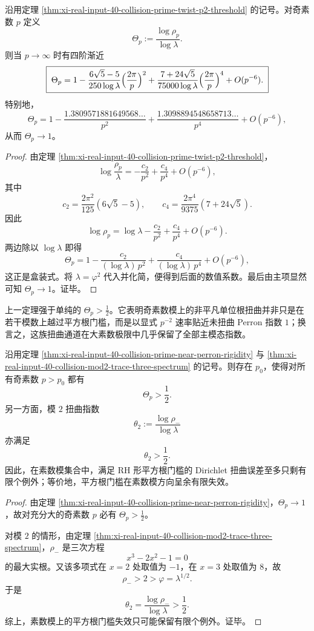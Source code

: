 \begin{theorem}[奇素数单位根扭曲的近主模态刚性]\label{thm:xi-real-input-40-collision-prime-near-perron-rigidity}
沿用定理 \ref{thm:xi-real-input-40-collision-prime-twist-p2-threshold} 的记号。对奇素数 \(p\) 定义
\[
\Theta_p:=\frac{\log \rho_p}{\log\lambda}.
\]
则当 \(p\to\infty\) 时有四阶渐近
\[
\boxed{\;
\Theta_p
=
1-\frac{6\sqrt5-5}{250\log\lambda}\Bigl(\frac{2\pi}{p}\Bigr)^2
+\frac{7+24\sqrt5}{75000\log\lambda}\Bigl(\frac{2\pi}{p}\Bigr)^4
+O(p^{-6}).\;}
\]
特别地，
\[
\Theta_p
=
1-\frac{1.3809571881649568\ldots}{p^2}
+\frac{1.3098894548658713\ldots}{p^4}
+O(p^{-6}),
\]
从而 \(\Theta_p\to 1\)。
\end{theorem}
\begin{proof}
由定理 \ref{thm:xi-real-input-40-collision-prime-twist-p2-threshold}，
\[
\log\frac{\rho_p}{\lambda}
=-\frac{c_2}{p^2}+\frac{c_4}{p^4}+O(p^{-6}),
\]
其中
\[
c_2=\frac{2\pi^2}{125}(6\sqrt5-5),
\qquad
c_4=\frac{2\pi^4}{9375}(7+24\sqrt5).
\]
因此
\[
\log\rho_p
=\log\lambda-\frac{c_2}{p^2}+\frac{c_4}{p^4}+O(p^{-6}).
\]
两边除以 \(\log\lambda\) 即得
\[
\Theta_p
=
1-\frac{c_2}{(\log\lambda)\,p^2}
+\frac{c_4}{(\log\lambda)\,p^4}
+O(p^{-6}),
\]
这正是盒装式。将 \(\lambda=\varphi^2\) 代入并化简，便得到后面的数值系数。最后由主项显然可知 \(\Theta_p\to 1\)。证毕。
\end{proof}

\begin{remark}[平方根门槛失效的强化]\label{rem:xi-real-input-40-collision-prime-near-perron-meaning}
上一定理强于单纯的 \(\Theta_p>\frac12\)。它表明奇素数模上的非平凡单位根扭曲并非只是在若干模数上越过平方根门槛，而是以显式 \(p^{-2}\) 速率贴近未扭曲 Perron 指数 \(1\)；换言之，这族扭曲通道在大素数极限中几乎保留了全部主模态指数。
\end{remark}

\begin{corollary}[素数模上的平方根门槛呈余有限失效]\label{cor:xi-real-input-40-collision-prime-cofinite-sqrt-failure}
沿用定理 \ref{thm:xi-real-input-40-collision-prime-near-perron-rigidity} 与
\ref{thm:xi-real-input-40-collision-mod2-trace-three-spectrum} 的记号。则存在 \(p_0\)，使得对所有奇素数 \(p>p_0\) 都有
\[
\Theta_p>\frac12.
\]
另一方面，模 \(2\) 扭曲指数
\[
\theta_2:=\frac{\log\rho_-}{\log\lambda}
\]
亦满足
\[
\theta_2>\frac12.
\]
因此，在素数模集合中，满足 RH 形平方根门槛的 Dirichlet 扭曲误差至多只剩有限个例外；等价地，平方根门槛在素数模方向呈余有限失效。
\end{corollary}
\begin{proof}
由定理 \ref{thm:xi-real-input-40-collision-prime-near-perron-rigidity}，\(\Theta_p\to 1\)，故对充分大的奇素数 \(p\) 必有 \(\Theta_p>\frac12\)。

对模 \(2\) 的情形，由定理 \ref{thm:xi-real-input-40-collision-mod2-trace-three-spectrum}，\(\rho_-\) 是三次方程
\[
x^3-2x^2-1=0
\]
的最大实根。又该多项式在 \(x=2\) 处取值为 \(-1\)，在 \(x=3\) 处取值为 \(8\)，故
\[
\rho_->2>\varphi=\lambda^{1/2}.
\]
于是
\[
\theta_2=\frac{\log\rho_-}{\log\lambda}>\frac12.
\]
综上，素数模上的平方根门槛失效只可能保留有限个例外。证毕。
\end{proof}


